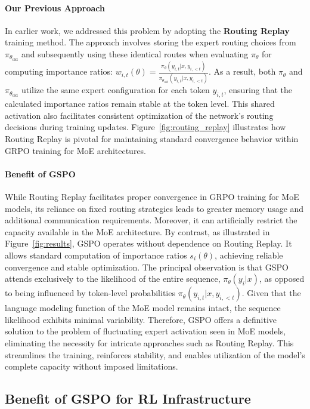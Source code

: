 \paragraph{Our Previous Approach} In earlier work, we addressed this problem by adopting the \textbf{Routing Replay} training method. The approach involves storing the expert routing choices from $\pi_{\theta_\text{old}}$ and subsequently using these identical routes when evaluating $\pi_{\theta}$ for computing importance ratios: $w_{i,t}(\theta) = \frac{ \pi_{\theta} (y_{i,t} | x, y_{i,<t}) }{ \pi_{\theta_\text{old}} (y_{i,t} | x,y_{i,<t})}$. As a result, both $\pi_{\theta}$ and $\pi_{\theta_\text{old}}$ utilize the same expert configuration for each token $y_{i,t}$, ensuring that the calculated importance ratios remain stable at the token level. This shared activation also facilitates consistent optimization of the network's routing decisions during training updates. Figure~\ref{fig:routing_replay} illustrates how Routing Replay is pivotal for maintaining standard convergence behavior within GRPO training for MoE architectures.

\paragraph{Benefit of GSPO} While Routing Replay facilitates proper convergence in GRPO training for MoE models, its reliance on fixed routing strategies leads to greater memory usage and additional communication requirements. Moreover, it can artificially restrict the capacity available in the MoE architecture. By contrast, as illustrated in Figure~\ref{fig:results}, GSPO operates without dependence on Routing Replay. It allows standard computation of importance ratios $s_i(\theta)$, achieving reliable convergence and stable optimization. The principal observation is that GSPO attends exclusively to the likelihood of the entire sequence, $\pi_{\theta} (y_i | x)$, as opposed to being influenced by token-level probabilities $\pi_{\theta} (y_{i,t} | x, y_{i,<t})$. Given that the language modeling function of the MoE model remains intact, the sequence likelihood exhibits minimal variability. Therefore, GSPO offers a definitive solution to the problem of fluctuating expert activation seen in MoE models, eliminating the necessity for intricate approaches such as Routing Replay. This streamlines the training, reinforces stability, and enables utilization of the model’s complete capacity without imposed limitations.

\subsection{Benefit of GSPO for RL Infrastructure}

